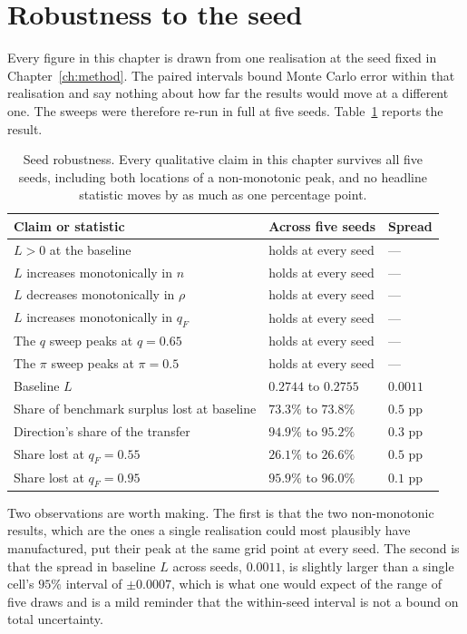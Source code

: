 \section{Robustness to the seed}
\label{sec:res-seeds}

Every figure in this chapter is drawn from one realisation at the seed fixed in
Chapter~\ref{ch:method}. The paired intervals bound Monte Carlo error within that
realisation and say nothing about how far the results would move at a different one. The
sweeps were therefore re-run in full at five seeds. Table~\ref{tab:seeds} reports the result.

\begin{table}[htbp]
\centering
\small
\begin{tabularx}{\textwidth}{Xll}
\toprule
\textbf{Claim or statistic} & \textbf{Across five seeds} & \textbf{Spread} \\
\midrule
$L > 0$ at the baseline & holds at every seed & --- \\
$L$ increases monotonically in $n$ & holds at every seed & --- \\
$L$ decreases monotonically in $\rho$ & holds at every seed & --- \\
$L$ increases monotonically in $q_F$ & holds at every seed & --- \\
The $q$ sweep peaks at $q = 0.65$ & holds at every seed & --- \\
The $\pi$ sweep peaks at $\pi = 0.5$ & holds at every seed & --- \\
\midrule
Baseline $L$ & $0.2744$ to $0.2755$ & $0.0011$ \\
Share of benchmark surplus lost at baseline & $73.3\%$ to $73.8\%$ & $0.5$ pp \\
Direction's share of the transfer & $94.9\%$ to $95.2\%$ & $0.3$ pp \\
Share lost at $q_F = 0.55$ & $26.1\%$ to $26.6\%$ & $0.5$ pp \\
Share lost at $q_F = 0.95$ & $95.9\%$ to $96.0\%$ & $0.1$ pp \\
\bottomrule
\end{tabularx}
\caption{Seed robustness. Every qualitative claim in this chapter survives all five seeds,
including both locations of a non-monotonic peak, and no headline statistic moves by as much
as one percentage point.}
\label{tab:seeds}
\end{table}

Two observations are worth making. The first is that the two non-monotonic results, which
are the ones a single realisation could most plausibly have manufactured, put their peak at
the same grid point at every seed. The second is that the spread in baseline $L$ across
seeds, $0.0011$, is slightly larger than a single cell's $95\%$ interval of $\pm 0.0007$,
which is what one would expect of the range of five draws and is a mild reminder that the
within-seed interval is not a bound on total uncertainty.

